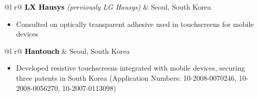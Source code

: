 \documentclass[letterpaper,9pt]{article}
\begin{document}
\vspace{-1mm}

\begin{tabularx}{\linewidth}{ @{}l r@{} }
\textcolor{Black}{\textbf{LX Hausys}} \textit{(previously LG Hausys)} & \hfill Seoul, South Korea \\[2pt]
\end{tabularx}
\vspace{-1em}
\begin{itemize}[nosep,after=\strut, leftmargin=1em, itemsep=2pt]
    \item Consulted on optically transparent adhesive used in touchscreens for mobile devices
\end{itemize}

\vspace{-1mm}

\begin{tabularx}{\linewidth}{ @{}l r@{} }
\textcolor{Black}{\textbf{Hantouch}} & \hfill Seoul, South Korea \\[1pt]
\end{tabularx}
\vspace{-1em}
\begin{itemize}[nosep,after=\strut, leftmargin=1em, itemsep=2pt]
    \item Developed resistive touchscreens integrated with  mobile devices, securing three patents in South Korea (Application Numbers: 10-2008-0070246, 10-2008-0056270, 10-2007-0113098)
\end{itemize}
\vspace{-2mm}
\end{document}
